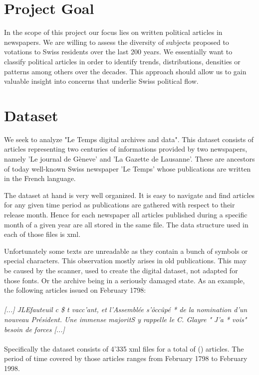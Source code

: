 \documentclass[11pt]{article}
\begin{document}
\section{Project Goal}

In the scope of this project our focus lies on written political articles in newspapers. We are willing to assess 
the diversity of subjects proposed to votations to Swiss residents over the last 200 years. We essentially
want to classify political articles in order to identify trends, distributions, densities or patterns among 
others over the decades. This approach should allow us to gain valuable insight into concerns that underlie Swiss
political flow. 

\section{Dataset}

We seek to analyze "Le Temps digital archives and data". This dataset consists of articles representing two centuries of informations provided by two newspapers, namely 'Le journal de Gèneve' and 'La Gazette de Lausanne'. These are ancestors of today well-known Swiss newspaper 'Le Temps' whose publications are written in the French language.

The dataset at hand is very well organized. It is easy to navigate and find articles for any given time
period as publications are gathered with respect to their release month. Hence for each newspaper all articles published during a specific month of a given year are all stored in the same file. The data structure used in each of those files is xml.

Unfortunately some texts are unreadable as they contain a bunch of symbols or special characters. This observation mostly arises in old publications. This may be caused by the scanner, used to create the digital dataset, not adapted for those fonts. Or the archive being in a seriously damaged state. As an example, the following articles issued on February 1798:\\
\\
\textit{[...] JLEfauteuil c \$ t vacc'ant, et l'Assemblée s'ôccûpé * de la nomination d'un nouveau Président. Une immense majoritS y rappelle le C. Glayre " J'a * vois" besoin de forces [...]}\\
\\
Specifically the dataset consists of 4'335 xml files for a total of () articles. The period of time covered by those articles ranges from February 1798 to February 1998.
\end{document}
